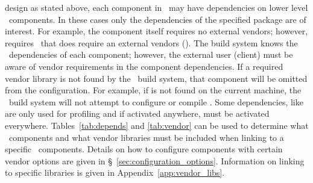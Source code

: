 design as stated above, each component in \draco\ may have dependencies
on lower level \draco\ components.  In these cases only the dependencies
of the specified package are of interest.  For example, the  
component itself requires no external vendors; however,  requires
\cfour\ that does require an external vendors ().  The build system
knows the \draco\ dependencies of each component; however, the external
user (client) must be aware of vendor requirements in the component
dependencies.  If a required vendor library is not found by the \draco\ build system, that component will be omitted from the configuration.  For example, if  is not found on the current machine, the \draco\ build system will not attempt to configure or compile .  Some dependencies, like  are only used for profiling and if activated anywhere, must be activated everywhere.
Tables~\ref{tab:depends} and \ref{tab:vendor} can be
used to determine what \draco\ components and what vendor libraries must
be included when linking to a specific \draco\ components.  Details on
how to configure components with certain vendor options are given in
\S~\ref{sec:configuration_options}.  Information on linking to
specific libraries is given in Appendix~\ref{app:vendor_libs}.

